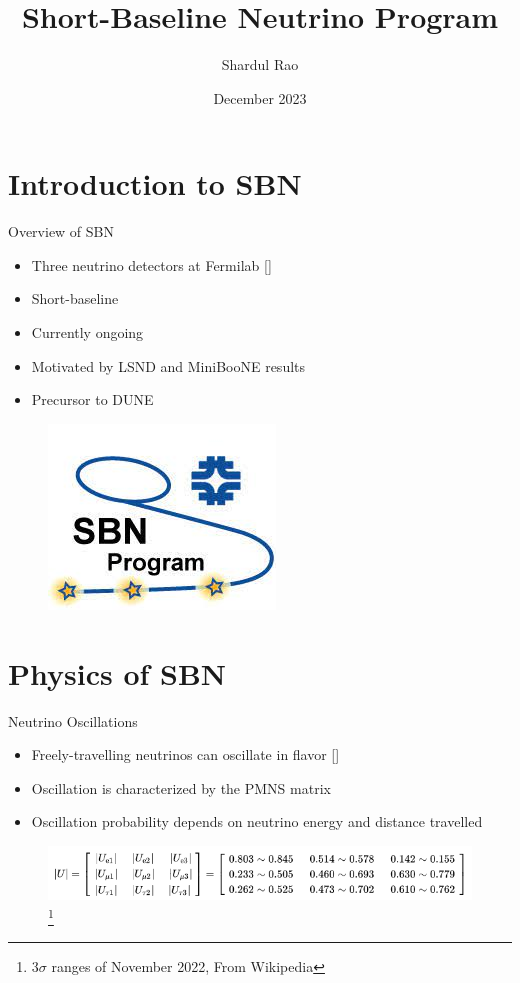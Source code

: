 \documentclass{beamer}
\title{Short-Baseline Neutrino Program}
\date{December 2023}
\author{Shardul Rao}
\begin{document}
\frame{\titlepage}
\normalsize

\section{Introduction to SBN}
\begin{frame}{Overview of SBN}
\begin{itemize}
    \item Three neutrino detectors at Fermilab \footnotesize[\cite{SBN-Paper}]\normalsize
    \vspace{0.5cm}
    \item Short-baseline
    \vspace{0.5cm}
    \item Currently ongoing
    \vspace{0.5cm}
    \item Motivated by LSND and MiniBooNE results
    \vspace{0.5cm}
    \item Precursor to DUNE
\end{itemize}

\begin{figure}
    \includegraphics[width = 0.25\linewidth]{umn/sbn-logo.jpg}
    \label{fig:sbn-logo}
\end{figure}
\end{frame}

\section{Physics of SBN}
\begin{frame}{Neutrino Oscillations}
    \begin{itemize}
        \item Freely-travelling neutrinos can oscillate in flavor \footnotesize[\cite{neutrino-oscillations}]\normalsize
        \vspace{0.5cm}
        \item Oscillation is characterized by the PMNS matrix
        \vspace{0.5cm}
        \item Oscillation probability depends on neutrino energy and distance travelled
    \end{itemize}

    \begin{figure}
        \centering
        \includegraphics[width = \linewidth]{umn/pmns2022.png}
        \footnote{3$\sigma$ ranges of November 2022, From Wikipedia}
        \label{fig:enter-label}
    \end{figure}
\end{frame}
\end{document}
